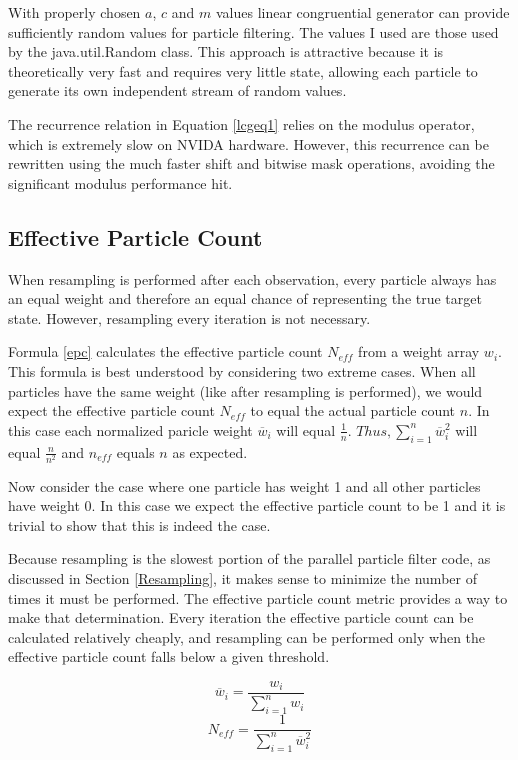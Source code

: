 \documentclass{article}
\begin{document}
With properly chosen \(a\), \(c\) and \(m\) values linear congruential generator can provide sufficiently random values for particle filtering.\cite{lcg} The values I used are those used by the java.util.Random class. This approach is attractive because it is theoretically very fast and requires very little state, allowing each particle to generate its own independent stream of random values.

The recurrence relation in Equation \ref{lcgeq1} relies on the modulus operator, which is extremely slow on NVIDA hardware.\cite{oprc} However, this recurrence can be rewritten using the much faster shift and bitwise mask operations, avoiding the significant modulus performance hit.

\subsection{Effective Particle Count}
When resampling is performed after each observation, every particle always has an equal weight and therefore an equal chance of representing the true target state. However, resampling every iteration is not necessary.

Formula \ref{epc} calculates the effective particle count \(N_{eff}\) from a weight array \(w_{i}\).\cite{pf} This formula is best understood by considering two extreme cases. When all particles have the same weight (like after resampling is performed), we would expect the effective particle count \(N_{eff}\) to equal the actual particle count \(n\). In this case each normalized paricle weight \(\overline{w}_{i}\) will equal \(\frac{1}{n}\). \( Thus, \sum_{i=1}^{n} \overline{w}_{i}^2 \) will equal \(\frac{n}{n^{2}}\) and \(n_{eff}\) equals \(n\) as expected.

Now consider the case where one particle has weight 1 and all other particles have weight 0. In this case we expect the effective particle count to be 1 and it is trivial to show that this is indeed the case.

Because resampling is the slowest portion of the parallel particle filter code, as discussed in Section \ref{Resampling}, it makes sense to minimize the number of times it must be performed. The effective particle count metric provides a way to make that determination. Every iteration the effective particle count can be calculated relatively cheaply, and resampling can be performed only when the effective particle count falls below a given threshold.

\[\overline{w}_{i} = \frac{w_{i}}{\sum_{i=1}^{n} w_{i}}\]
\begin{equation}\label{epc}
N_{eff} = \frac{1}{\sum_{i=1}^{n} \overline{w}_{i}^2}
\end{equation}
\end{document}
